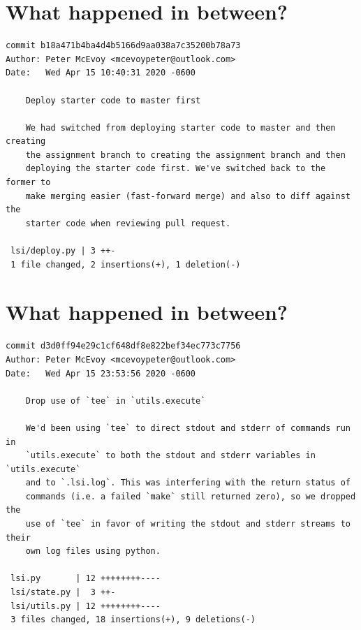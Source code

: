 \documentclass{article}
\begin{document}
\newpage

\section*{What happened in between?}
\vspace{2ex}
\begin{verbatim}
commit b18a471b4ba4d4b5166d9aa038a7c35200b78a73
Author: Peter McEvoy <mcevoypeter@outlook.com>
Date:   Wed Apr 15 10:40:31 2020 -0600

    Deploy starter code to master first
    
    We had switched from deploying starter code to master and then creating
    the assignment branch to creating the assignment branch and then
    deploying the starter code first. We've switched back to the former to
    make merging easier (fast-forward merge) and also to diff against the
    starter code when reviewing pull request.

 lsi/deploy.py | 3 ++-
 1 file changed, 2 insertions(+), 1 deletion(-)

\end{verbatim}

\newpage

\section*{What happened in between?}
\vspace{2ex}
\begin{verbatim}
commit d3d0ff94e29c1cf648df8e822bef34ec773c7756
Author: Peter McEvoy <mcevoypeter@outlook.com>
Date:   Wed Apr 15 23:53:56 2020 -0600

    Drop use of `tee` in `utils.execute`
    
    We'd been using `tee` to direct stdout and stderr of commands run in
    `utils.execute` to both the stdout and stderr variables in `utils.execute`
    and to `.lsi.log`. This was interfering with the return status of
    commands (i.e. a failed `make` still returned zero), so we dropped the
    use of `tee` in favor of writing the stdout and stderr streams to their
    own log files using python.

 lsi.py       | 12 ++++++++----
 lsi/state.py |  3 ++-
 lsi/utils.py | 12 ++++++++----
 3 files changed, 18 insertions(+), 9 deletions(-)

\end{verbatim}

\newpage
\end{document}
